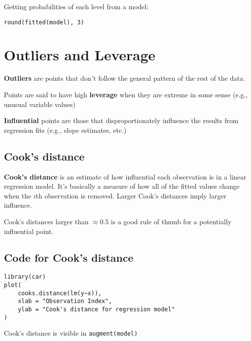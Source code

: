 \documentclass[titlepage, 12pt, leqno]{article}
\begin{document}
Getting probabilities of each level from a model:
\begin{verbatim}
round(fitted(model), 3)
\end{verbatim}

\pagebreak
\section{Outliers and Leverage}
\begin{definition}
    \textbf{Outliers} are points that don't follow the general pattern of the
    rest of the data.
\end{definition}

\begin{definition}
    Points are said to have high \textbf{leverage} when they are extreme in 
    some sense (e.g., unusual variable values)
\end{definition}

\begin{definition}
    \textbf{Influential} points are those that disproportionately influence the
    results from regression fits (e.g., slope estimates, etc.)
\end{definition}

\subsection{Cook's distance}
\textbf{Cook's distance} is an estimate of how influential each observation is
in a linear regression model. It's basically a measure of how all of the fitted
values change when the $i$th observation is removed. Larger Cook's distances
imply larger influence. 

\begin{note}
    Cook's distances larger than $\approx 0.5$ is a good rule of thumb for a
    potentially influential point.
\end{note}

\subsection{Code for Cook's distance}
\begin{verbatim}
library(car)
plot(
    cooks.distance(lm(y~x)), 
    xlab = "Observation Index", 
    ylab = "Cook's distance for regression model"
)
\end{verbatim}

\begin{note}
    Cook's distance is visible in \texttt{augment(model)} 
\end{note}
\end{document}
